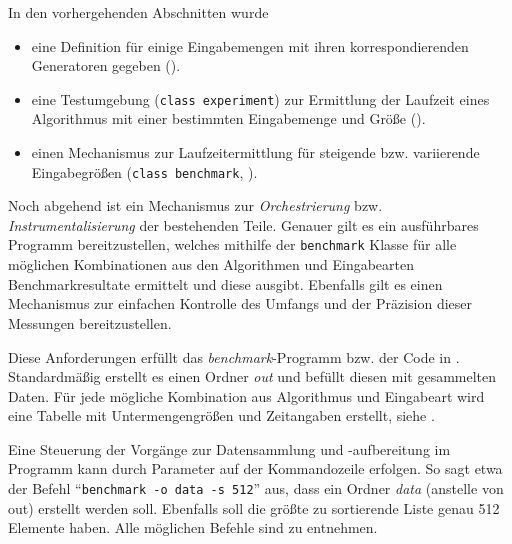 In den vorhergehenden Abschnitten wurde

\begin{itemize}
    \item eine Definition für einige Eingabemengen mit ihren korrespondierenden Generatoren gegeben ().
    \item eine Testumgebung (\lstinline{class experiment}) zur Ermittlung der Laufzeit eines Algorithmus mit einer bestimmten Eingabemenge und Größe ().
    \item einen Mechanismus zur Laufzeitermittlung für steigende bzw. variierende Eingabegrößen (\lstinline{class benchmark}, ).
\end{itemize}

Noch abgehend ist ein Mechanismus zur \emph{Orchestrierung} bzw. \emph{Instrumentalisierung} der bestehenden Teile. Genauer gilt es ein ausführbares Programm bereitzustellen, welches mithilfe der \lstinline{benchmark} Klasse für alle möglichen Kombinationen aus den Algorithmen und Eingabearten Benchmarkresultate ermittelt und diese ausgibt. Ebenfalls gilt es einen Mechanismus zur einfachen Kontrolle des Umfangs und der Präzision dieser Messungen bereitzustellen.



Diese Anforderungen erfüllt das \emph{benchmark}-Programm bzw. der Code in \crMain. Standardmäßig erstellt es einen Ordner \emph{out} und befüllt diesen mit gesammelten Daten. Für jede mögliche Kombination aus Algorithmus und Eingabeart wird eine Tabelle mit Untermengengrößen und Zeitangaben erstellt, siehe .

Eine Steuerung der Vorgänge zur Datensammlung und -aufbereitung im Programm kann durch Parameter auf der Kommandozeile erfolgen. So sagt etwa der Befehl \enquote{\lstinline{benchmark -o data -s 512}} aus, dass ein Ordner \emph{data} (anstelle von out) erstellt werden soll. Ebenfalls soll die größte zu sortierende Liste genau 512 Elemente haben. Alle möglichen Befehle sind  zu entnehmen.

